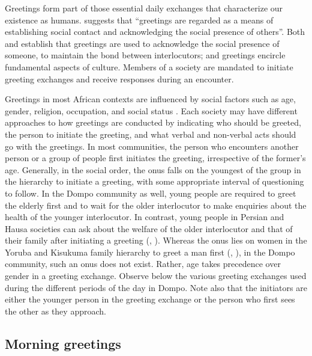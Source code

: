 \documentclass[output=paper,colorlinks,citecolor=brown]{langscibook}
\begin{document}
Greetings form part of those essential daily exchanges that characterize our existence as humans. \citet[14]{Egblewogbe1990} suggests that “greetings are regarded as a means of establishing social contact and acknowledging the social presence of others”. Both \citet{Egblewogbe1990} and \citet{Foley1997} establish that greetings are used to acknowledge the social presence of someone, to maintain the bond between interlocutors; and greetings encircle fundamental aspects of culture.  Members of a society are mandated to initiate greeting exchanges and receive responses during an encounter. 

Greetings in most African contexts are influenced by social factors such as age, gender, religion, occupation, and social status \parencites[14]{Egblewogbe1990}[37]{Nwoye1993}. Each society may have different approaches to how greetings are conducted by indicating who should be greeted, the person to initiate the greeting, and what verbal and non-verbal acts should go with the greetings. In most communities, the person who encounters another person or a group of people first initiates the greeting, irrespective of the former’s age. Generally, in the social order, the onus falls on the youngest of the group in the hierarchy to initiate a greeting, with some appropriate interval of questioning to follow. In the Dompo community as well, young people are required to greet the elderly first and to wait for the older interlocutor to make enquiries about the health of the younger interlocutor. In contrast, young people in Persian and Hausa societies can ask about the welfare of the older interlocutor and that of their family after initiating a greeting (\cite[263]{Chamo2015}, \cite[300]{Moradi2017}). Whereas the onus lies on women in the Yoruba and Kisukuma family hierarchy to greet a man first (\cite[2]{Akindele1990}, \cite[93]{Batibo2009}), in the Dompo community, such an onus does not exist. Rather, age takes precedence over gender in a greeting exchange. Observe below the various greeting exchanges used during the different periods of the day in Dompo. Note also that the initiators are either the younger person in the greeting exchange or the person who first sees the other as they approach.

\subsection{Morning greetings}
\end{document}
